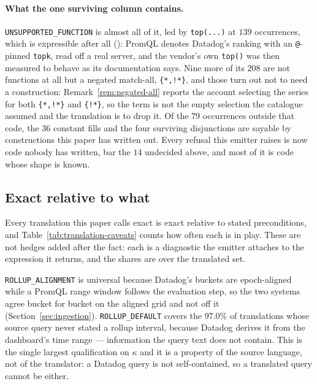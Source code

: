 \paragraph{What the one surviving column contains.}
\texttt{UNSUPPORTED\_FUNCTION} is almost all of
it, led by \texttt{top(...)} at $139$ occurrences, which is expressible after all
(): PromQL denotes Datadog's ranking with an \texttt{@}-pinned
\texttt{topk}, read off a real server, and the vendor's own \texttt{top()} was then
measured to behave as its documentation says. Nine more of its $208$ are not
functions at all but a negated match-all, \texttt{\{*,!*\}}, and those turn out not to
need a construction: Remark~\ref{rem:negated-all} reports the account selecting the
series for both \texttt{\{*,!*\}} and \texttt{\{!*\}}, so the term is not the empty
selection the catalogue assumed and the translation is to drop it. Of the $79$
occurrences outside that code, the $36$ constant fills and the four surviving
disjunctions are sayable by constructions this paper has written out. Every refusal this emitter raises
is now code nobody has written, bar the $14$ undecided above, and most of it is code
whose shape is known.

\iffull\fi
\iffull\fi
\iffull\fi
\iffull\fi
\iffull\fi
\iffull\fi
\iffull\fi
\iffull\fi
\subsection{Exact relative to what}
\label{sec:caveats}

Every translation this paper calls exact is exact relative to stated preconditions, and
Table~\ref{tab:translation-caveats} counts how often each is in play. These are not
hedges added after the fact: each is a diagnostic the emitter attaches to the expression
it returns, and the shares are over the translated set.

\begin{table}[htbp]\centering\footnotesize

\caption{Preconditions carried by the translated expressions. A translation may carry
more than one.}
\label{tab:translation-caveats}
\end{table}

\texttt{ROLLUP\_ALIGNMENT} is universal because Datadog's buckets are epoch-aligned
while a PromQL range window follows the evaluation step, so the two systems agree bucket
for bucket on the aligned grid and not off it (Section~\ref{sec:ingestion}).
\texttt{ROLLUP\_DEFAULT} covers the $97.0\%$ of translations whose source query never
stated a rollup interval, because Datadog derives it from the dashboard's time range ---
information the query text does not contain. This is the single largest qualification on
$\kappa$ and it is a property of the source language, not of the translator: a Datadog
query is not self-contained, so a translated query cannot be either.


